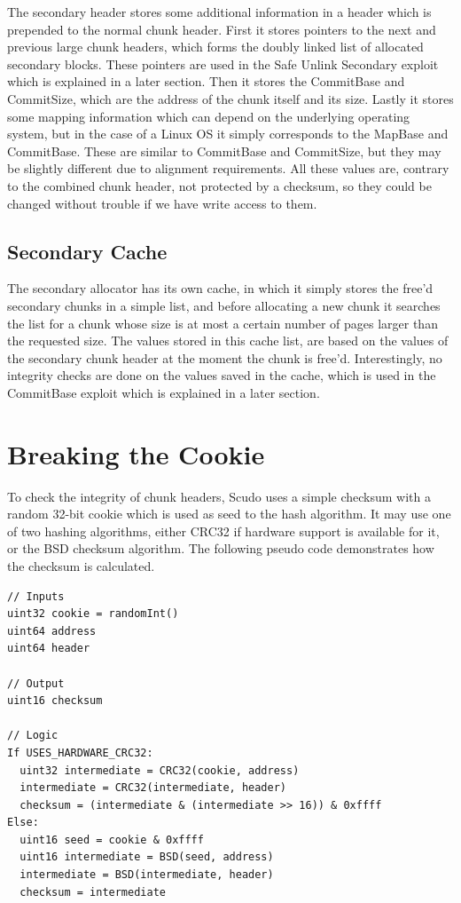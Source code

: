 \documentclass[a4paper,11pt,oneside]{report}
\begin{document}
The secondary header stores some additional information in a header which is prepended to
the normal chunk header. First it stores pointers to the next and previous large chunk
headers, which forms the doubly linked list of allocated secondary blocks. These pointers
are used in the Safe Unlink Secondary exploit which is explained in a later section. Then
it stores the CommitBase and CommitSize, which are the address of the chunk itself and its
size. Lastly it stores some mapping information which can depend on the underlying
operating system, but in the case of a Linux OS it simply corresponds to the MapBase and
CommitBase. These are similar to CommitBase and CommitSize, but they may be slightly
different due to alignment requirements. All these values are, contrary to the combined
chunk header, not protected by a checksum, so they could be changed without trouble if we
have write access to them.

\section{Secondary Cache}

The secondary allocator has its own cache, in which it simply stores the free'd secondary
chunks in a simple list, and before allocating a new chunk it searches the list for a
chunk whose size is at most a certain number of pages larger than the requested size. The
values stored in this cache list, are based on the values of the secondary chunk header at
the moment the chunk is free'd. Interestingly, no integrity checks are done on the values
saved in the cache, which is used in the CommitBase exploit which is explained in a later
section.


\chapter{Breaking the Cookie}

To check the integrity of chunk headers, Scudo uses a simple checksum with a random 32-bit
cookie which is used as seed to the hash algorithm. It may use one of two hashing
algorithms, either CRC32 if hardware support is available for it, or the BSD checksum
algorithm. The following pseudo code demonstrates how the checksum is calculated.
\begin{verbatim}
// Inputs
uint32 cookie = randomInt()
uint64 address
uint64 header

// Output
uint16 checksum

// Logic
If USES_HARDWARE_CRC32:
  uint32 intermediate = CRC32(cookie, address)
  intermediate = CRC32(intermediate, header)
  checksum = (intermediate & (intermediate >> 16)) & 0xffff
Else:
  uint16 seed = cookie & 0xffff
  uint16 intermediate = BSD(seed, address)
  intermediate = BSD(intermediate, header)
  checksum = intermediate
\end{verbatim}
\end{document}
